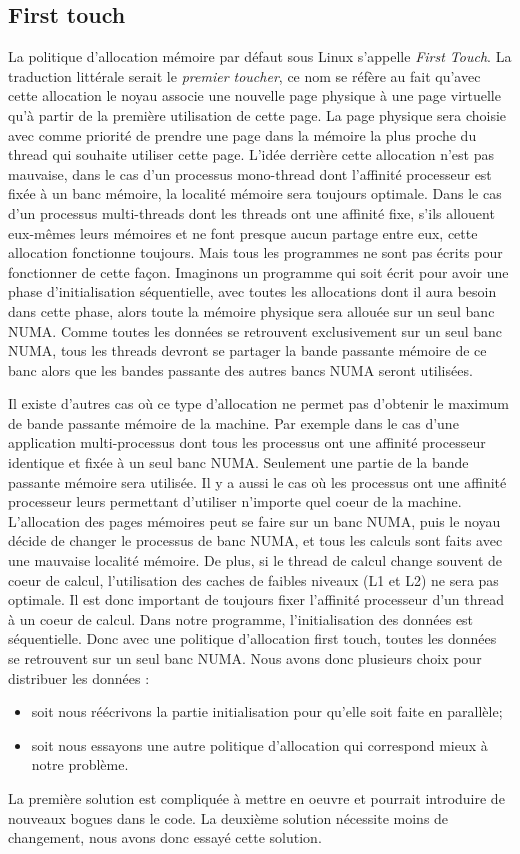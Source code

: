 \subsection{First touch}
La politique d'allocation mémoire par défaut sous Linux s'appelle {\em First Touch}.
%
La traduction littérale serait le {\em premier toucher}, ce nom se réfère au fait qu'avec cette allocation le noyau associe une nouvelle page physique à une page virtuelle qu'à partir de la première utilisation de cette page.
%
La page physique sera choisie avec comme priorité de prendre une page dans la mémoire la plus proche du thread qui souhaite utiliser cette page.
%
L'idée derrière cette allocation n'est pas mauvaise, dans le cas d'un processus mono-thread dont l'affinité processeur est fixée à un banc mémoire, la localité mémoire sera toujours optimale.
%
Dans le cas d'un processus multi-threads dont les threads ont une affinité fixe, s'ils allouent eux-mêmes leurs mémoires et ne font presque aucun partage entre eux, cette allocation fonctionne toujours.
%
Mais tous les programmes ne sont pas écrits pour fonctionner de cette façon.
%
Imaginons un programme qui soit écrit pour avoir une phase d'initialisation séquentielle, avec toutes les allocations dont il aura besoin dans cette phase, alors toute la mémoire physique sera allouée sur un seul banc NUMA.
%
Comme toutes les données se retrouvent exclusivement sur un seul banc NUMA, tous les threads devront se partager la bande passante mémoire de ce banc alors que les bandes passante des autres bancs NUMA seront utilisées.


Il existe d'autres cas où ce type d'allocation ne permet pas d'obtenir le maximum de bande passante mémoire de la machine.
%
Par exemple dans le cas d'une application multi-processus dont tous les processus ont une affinité processeur identique et fixée à un seul banc NUMA.
%
Seulement une partie de la bande passante mémoire sera utilisée.
%
Il y a aussi le cas où les processus ont une affinité processeur leurs permettant d'utiliser n'importe quel coeur de la machine.
%
L'allocation des pages mémoires peut se faire sur un banc NUMA, puis le noyau décide de changer le processus de banc NUMA, et tous les calculs sont faits avec une mauvaise localité mémoire.
%
De plus, si le thread de calcul change souvent de coeur de calcul, l'utilisation des caches de faibles niveaux (L1 et L2) ne sera pas optimale.
%
Il est donc important de toujours fixer l'affinité processeur d'un thread à un coeur de calcul.
%
Dans notre programme, l'initialisation des données est séquentielle. Donc avec une politique d'allocation first touch, toutes les données se retrouvent sur un seul banc NUMA.
%
Nous avons donc plusieurs choix pour distribuer les données :
\begin{itemize}
  \item soit nous réécrivons la partie initialisation pour qu'elle soit faite en parallèle;
  \item soit nous essayons une autre politique d'allocation qui correspond mieux à notre problème.
\end{itemize}
%
La première solution est compliquée à mettre en oeuvre et pourrait introduire de nouveaux bogues dans le code.
%
La deuxième solution nécessite moins de changement, nous avons donc essayé cette solution.
